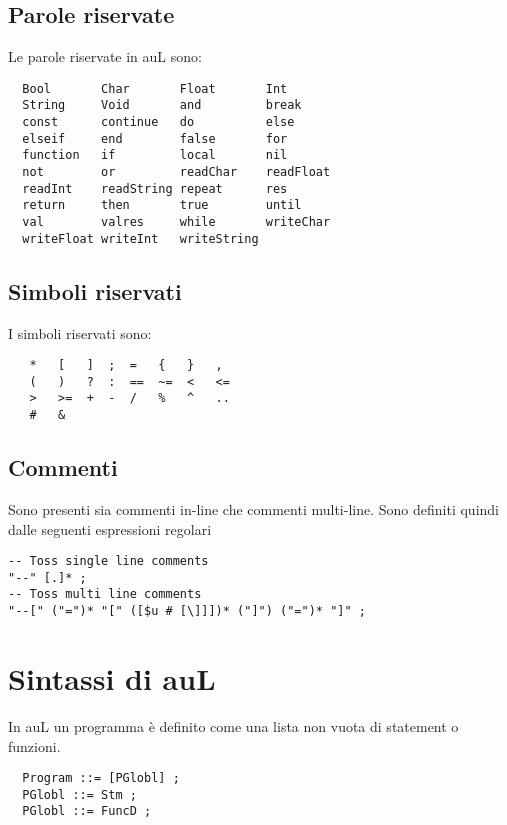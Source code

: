 \documentclass{article}
\begin{document}
\subsection*{Parole riservate}
Le parole riservate in auL sono:
\begin{verbatim}
  Bool       Char       Float       Int
  String     Void       and         break
  const      continue   do          else        
  elseif     end        false       for
  function   if         local       nil
  not        or         readChar    readFloat
  readInt    readString repeat      res
  return     then       true        until
  val        valres     while       writeChar
  writeFloat writeInt   writeString
\end{verbatim}

\subsection*{Simboli riservati}
I simboli riservati sono:
\begin{verbatim}
   *   [   ]  ;  =   {   }   ,
   (   )   ?  :  ==  ~=  <   <=
   >   >=  +  -  /   %   ^   ..
   #   &
\end{verbatim}
\subsection*{Commenti}
Sono presenti sia commenti in-line che commenti multi-line. Sono definiti quindi dalle seguenti espressioni regolari
\begin{verbatim}
-- Toss single line comments
"--" [.]* ;
-- Toss multi line comments
"--[" ("=")* "[" ([$u # [\]]])* ("]") ("=")* "]" ;
\end{verbatim}

\section{Sintassi di auL}
In auL un programma è definito come una lista non vuota di statement o funzioni.
\begin{verbatim}
  Program ::= [PGlobl] ;
  PGlobl ::= Stm ;
  PGlobl ::= FuncD ;
\end{verbatim}
\end{document}
